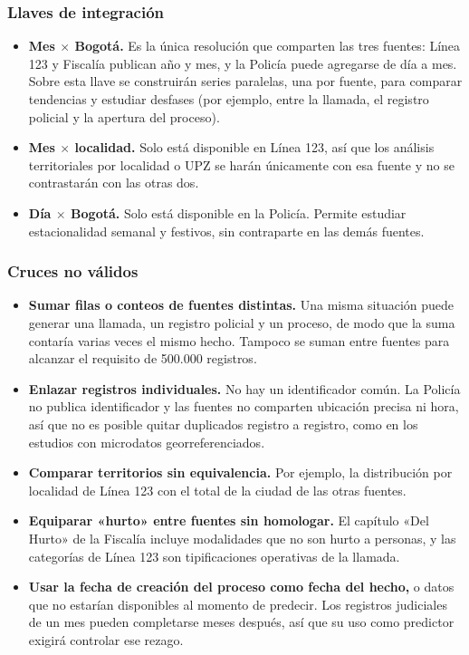 \documentclass[12pt,letterpaper]{article}
\begin{document}
\subsubsection{Llaves de integración}

\begin{itemize}
  \item \textbf{Mes $\times$ Bogotá.} Es la única resolución que comparten las tres fuentes: Línea 123 y Fiscalía publican año y mes, y la Policía puede agregarse de día a mes. Sobre esta llave se construirán series paralelas, una por fuente, para comparar tendencias y estudiar desfases (por ejemplo, entre la llamada, el registro policial y la apertura del proceso).
  \item \textbf{Mes $\times$ localidad.} Solo está disponible en Línea 123, así que los análisis territoriales por localidad o UPZ se harán únicamente con esa fuente y no se contrastarán con las otras dos.
  \item \textbf{Día $\times$ Bogotá.} Solo está disponible en la Policía. Permite estudiar estacionalidad semanal y festivos, sin contraparte en las demás fuentes.
\end{itemize}

\subsubsection{Cruces no válidos}

\begin{itemize}
  \item \textbf{Sumar filas o conteos de fuentes distintas.} Una misma situación puede generar una llamada, un registro policial y un proceso, de modo que la suma contaría varias veces el mismo hecho. Tampoco se suman entre fuentes para alcanzar el requisito de 500.000 registros.
  \item \textbf{Enlazar registros individuales.} No hay un identificador común. La Policía no publica identificador y las fuentes no comparten ubicación precisa ni hora, así que no es posible quitar duplicados registro a registro, como en los estudios con microdatos georreferenciados.
  \item \textbf{Comparar territorios sin equivalencia.} Por ejemplo, la distribución por localidad de Línea 123 con el total de la ciudad de las otras fuentes.
  \item \textbf{Equiparar «hurto» entre fuentes sin homologar.} El capítulo «Del Hurto» de la Fiscalía incluye modalidades que no son hurto a personas, y las categorías de Línea 123 son tipificaciones operativas de la llamada.
  \item \textbf{Usar la fecha de creación del proceso como fecha del hecho,} o datos que no estarían disponibles al momento de predecir. Los registros judiciales de un mes pueden completarse meses después, así que su uso como predictor exigirá controlar ese rezago.
\end{itemize}
\end{document}
